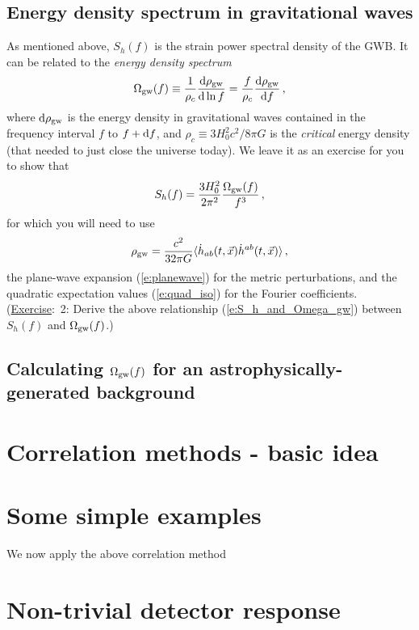 \documentclass[11pt]{article}
\numberwithin{equation}{section}
\def\be{\begin{equation}}
\def\ee{\end{equation}}
\def\D{{\rm d}}
\def\exer{\underline{Exercise}:\ }
\begin{document}
\subsection{Energy density spectrum in gravitational waves}
\label{s:Omega_gw}

As mentioned above, $S_h(f)$ is the strain power 
spectral density of the GWB.
It can be related to the {\em energy density spectrum}
%
\be
\Omega_{\rm gw}(f) 
\equiv \frac{1}{\rho_c}\frac{\D\rho_{\rm gw}}{\D\ln f}
=\frac{f}{\rho_c}\frac{\D\rho_{\rm gw}}{\D f}\,,
\ee
%
where $\D\rho_{\rm gw}$ is the energy density in gravitational
waves contained in the frequency interval $f$ to $f+\D f$, and 
$\rho_c\equiv {3 H_0^2 c^2}/{8\pi G}$
is the {\em critical} energy density (that needed to just 
close the universe today).
We leave it as an exercise for you to show that
%
\be
S_h(f) = \frac{3H_0^2}{2\pi^2}\frac{\Omega_{\rm gw}(f)}{f^3}\,,
\label{e:S_h_and_Omega_gw}
\ee
%
for which you will need to use
%
\be
\rho_{\rm gw} = \frac{c^2}{32\pi G}
\langle \dot h_{ab}(t,\vec x)\dot h^{ab}(t,\vec x)\rangle\,,
\ee
%
the plane-wave expansion (\ref{e:planewave}) for the
metric perturbations, and the quadratic expectation
values (\ref{e:quad_iso}) for the Fourier coefficients.
(\exer 2: Derive the above relationship
(\ref{e:S_h_and_Omega_gw}) 
between $S_h(f)$ and $\Omega_{\rm gw}(f)$.)

\subsection{Calculating $\Omega_{\rm gw}(f)$ for an
astrophysically-generated background}
\label{s:Phinney_formula}

\section{Correlation methods - basic idea}
\label{s:correlations}

\section{Some simple examples}
\label{s:simple_examples}

We now apply the above correlation method

\section{Non-trivial detector response}
\end{document}
